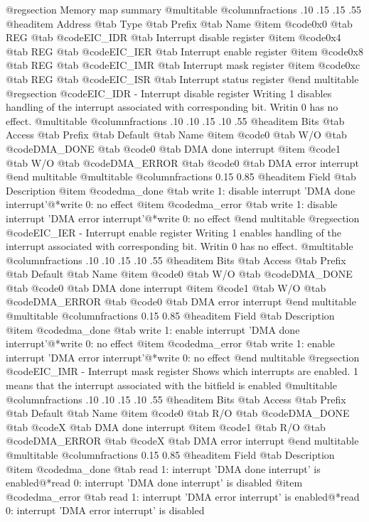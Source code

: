 @regsection Memory map summary
@multitable  @columnfractions .10 .15 .15 .55
@headitem Address @tab Type @tab Prefix @tab Name
@item @code{0x0} @tab
REG @tab
@code{EIC_IDR} @tab
Interrupt disable register
@item @code{0x4} @tab
REG @tab
@code{EIC_IER} @tab
Interrupt enable register
@item @code{0x8} @tab
REG @tab
@code{EIC_IMR} @tab
Interrupt mask register
@item @code{0xc} @tab
REG @tab
@code{EIC_ISR} @tab
Interrupt status register
@end multitable 
@regsection @code{EIC_IDR} - Interrupt disable register
Writing 1 disables handling of the interrupt associated with corresponding bit. Writin 0 has no effect.
@multitable @columnfractions .10 .10 .15 .10 .55
@headitem Bits @tab Access @tab Prefix @tab Default @tab Name
@item @code{0}
@tab W/O @tab
@code{DMA_DONE}
@tab @code{0} @tab 
DMA done interrupt
@item @code{1}
@tab W/O @tab
@code{DMA_ERROR}
@tab @code{0} @tab 
DMA error interrupt
@end multitable
@multitable @columnfractions 0.15 0.85
@headitem Field @tab Description
@item @code{dma_done} @tab write 1: disable interrupt 'DMA done interrupt'@*write 0: no effect
@item @code{dma_error} @tab write 1: disable interrupt 'DMA error interrupt'@*write 0: no effect
@end multitable
@regsection @code{EIC_IER} - Interrupt enable register
Writing 1 enables handling of the interrupt associated with corresponding bit. Writin 0 has no effect.
@multitable @columnfractions .10 .10 .15 .10 .55
@headitem Bits @tab Access @tab Prefix @tab Default @tab Name
@item @code{0}
@tab W/O @tab
@code{DMA_DONE}
@tab @code{0} @tab 
DMA done interrupt
@item @code{1}
@tab W/O @tab
@code{DMA_ERROR}
@tab @code{0} @tab 
DMA error interrupt
@end multitable
@multitable @columnfractions 0.15 0.85
@headitem Field @tab Description
@item @code{dma_done} @tab write 1: enable interrupt 'DMA done interrupt'@*write 0: no effect
@item @code{dma_error} @tab write 1: enable interrupt 'DMA error interrupt'@*write 0: no effect
@end multitable
@regsection @code{EIC_IMR} - Interrupt mask register
Shows which interrupts are enabled. 1 means that the interrupt associated with the bitfield is enabled
@multitable @columnfractions .10 .10 .15 .10 .55
@headitem Bits @tab Access @tab Prefix @tab Default @tab Name
@item @code{0}
@tab R/O @tab
@code{DMA_DONE}
@tab @code{X} @tab 
DMA done interrupt
@item @code{1}
@tab R/O @tab
@code{DMA_ERROR}
@tab @code{X} @tab 
DMA error interrupt
@end multitable
@multitable @columnfractions 0.15 0.85
@headitem Field @tab Description
@item @code{dma_done} @tab read 1: interrupt 'DMA done interrupt' is enabled@*read 0: interrupt 'DMA done interrupt' is disabled
@item @code{dma_error} @tab read 1: interrupt 'DMA error interrupt' is enabled@*read 0: interrupt 'DMA error interrupt' is disabled

